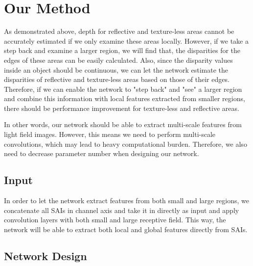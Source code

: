 \documentclass[10pt,twocolumn,letterpaper]{article}
\begin{document}
\section{Our Method}

As demonstrated above, depth for reflective and texture-less areas cannot be accurately estimated if we only examine these areas locally. However, if we take a step back and examine a larger region, we will find that, the disparities for the edges of these areas can be easily calculated. Also, since the disparity values inside an object should be continuous, we can let the network estimate the disparities of reflective and texture-less areas based on those of their edges. Therefore, if we can enable the network to "step back" and "see" a larger region and combine this information with local features extracted from smaller regions, there should be performance improvement for texture-less and reflective areas.

In other words, our network should be able to extract multi-scale features from light field images. However, this means we need to perform multi-scale convolutions, which may lead to heavy computational burden. Therefore, we also need to decrease parameter number when designing our network.

\subsection{Input}

In order to let the network extract features from both small and large regions, we concatenate all SAIs in channel axis and take it in directly as input and apply convolution layers with both small and large receptive field. This way, the network will be able to extract both local and global features directly from SAIs.


\subsection{Network Design}
\end{document}
